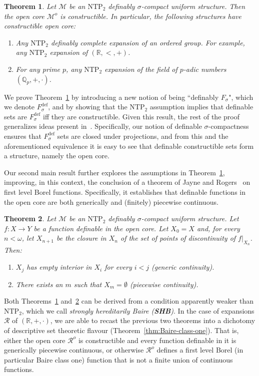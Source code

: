 \documentclass[12pt]{article}
\newcommand{\Mm}{\mathcal{M}}
\newcommand{\Rr}{\mathcal{R}}
\newcommand{\dF}{\ensuremath{F_\sigma^{\text{def}}}}
\newcommand{\BP}{\textbf{SHB}}
\newcommand{\R}{\mathbb{R}}
\newcommand{\Q}{\mathbb{Q}}
\newcommand{\NTP}{\ensuremath{\mathrm{NTP}_2}}
\newcommand{\Mo}{\Mm^o}%
\newcommand{\Ro}{\Rr^o}
\newtheorem{thmA}{Theorem}
\theoremstyle{definition}
\theoremstyle{remark}
\begin{document}
\begin{thmA}\label{thm:main-intro}
Let $\Mm$ be an $\NTP$ definably $\sigma$-compact uniform structure. Then the open core $\Mo$ is constructible. In particular, the following structures have constructible open core:
\begin{enumerate}
    \item  Any $\NTP$ definably complete expansion of an ordered group. For example, any $\NTP$ expansion of $(\R,<,+)$.
    \item For any prime $p$, any $\NTP$ expansion of the field of $p$-adic numbers $(\Q_p,+,\cdot)$.
\end{enumerate}
\end{thmA}

We prove Theorem~\ref{thm:main-intro} by introducing a new notion of being ``definably $F_\sigma$", which we denote $\dF$, and by showing that the $\NTP$ assumption implies that definable sets are $\dF$ iff they are constructible. Given this result, the rest of the proof generalizes ideas present in~\cite{MS99, DMS10}. Specifically, our notion of definable $\sigma$-compactness ensures that $\dF$ sets are closed under projections, and from this and the aforementioned equivalence it is easy to see that definable constructible sets form a structure, namely the open core.

Our second main result further explores the assumptions in Theorem~\ref{thm:main-intro}, improving, in this context, the conclusion of a theorem of Jayne and Rogers~\cite{Jayne-Rogers} on first level Borel functions. Specifically, it establishes that definable functions in the open core are both generically and (finitely) piecewise continuous. 

\begin{thmA}\label{thm:f-intro}
Let $\Mm$ be an $\NTP$ definably $\sigma$-compact uniform structure. Let $f:X\rightarrow Y$ be a function definable in the open core. Let $X_0=X$ and, for every $n<\omega$, let $X_{n+1}$ be the closure in $X_n$ of the set of points of discontinuity of $f|_{X_n}$. Then:
\begin{enumerate}
     \item $X_j$ has empty interior in $X_i$ for every $i<j$ (generic continuity).
     \item There exists an $m$ such that $X_m=\emptyset$ (piecewise continuity).  
\end{enumerate}
\end{thmA}

Both Theorems~\ref{thm:main-intro} and~\ref{thm:f-intro} can be derived from a condition apparently weaker than $\NTP$, which we call \emph{strongly hereditarily Baire (\BP)}. In the case of expansions $\Rr$ of $(\R,+,\cdot)$, we are able to recast the previous two theorems into a dichotomy of descriptive set theoretic flavour (Theorem~\ref{thm:Baire-class-one}). That is, either the open core $\Ro$ is constructible and every function definable in it is generically piecewise continuous, or otherwise $\Ro$ defines a first level Borel (in particular Baire class one) function that is not a finite union of continuous functions.
\end{document}
